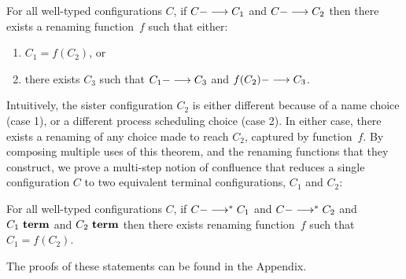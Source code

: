 \begin{theorem}
For all well-typed configurations $C$,
%
 if $C ---> C_1$ 
and $C ---> C_2$ 
then 
there exists a renaming function~$f$ 
such that either:
\begin{enumerate}
\item %
$C_1 = f(C_2)$,
or
\item there exists $C_3$ such that $C_1 ---> C_3$ and $f(C_2) ---> C_3$.
\end{enumerate}
\end{theorem}

Intuitively, the sister configuration $C_2$ is either different
because of a name choice (case 1), or a different process scheduling choice
(case 2).  In either case, there exists a renaming of any choice made
to reach $C_2$, captured by function~$f$.
%
By composing multiple uses of this theorem, and the renaming functions
that they construct, we prove a multi-step notion of confluence that 
reduces a single configuration $C$ to two equivalent terminal configurations,
 $C_1$ and $C_2$:

\begin{theorem}
For all well-typed configurations $C$,
%
 if $C --->^\ast C_1$ 
and $C --->^\ast C_2$ 
and $C_1~\textbf{term}$
and $C_2~\textbf{term}$
then 
there exists renaming function~$f$ 
such that $C_1 = f(C_2)$.
\end{theorem}

The proofs of these statements can be found in the Appendix.
